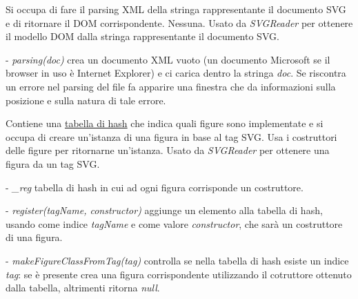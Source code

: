 Si occupa di fare il parsing XML della stringa rappresentante il documento SVG e di ritornare il DOM corrispondente.
Nessuna.
Usato da \textit{SVGReader} per ottenere il modello DOM dalla stringa rappresentante il documento SVG.
\begin{elencopuntato}[\subsubsecindent]
\item[-] \textit{parsing(doc)} crea un documento XML vuoto (un documento Microsoft se il browser in uso \`e Internet Explorer) e ci carica dentro la stringa \textit{doc}. Se riscontra un errore nel parsing del file fa apparire una finestra che da informazioni sulla posizione e sulla natura di tale errore.
\end{elencopuntato}

Contiene una \underline{tabella di hash} che indica quali figure sono implementate e si occupa di creare un'istanza di una figura in base al tag SVG.
Usa i costruttori delle figure per ritornarne un'istanza.
Usato da \textit{SVGReader} per ottenere una figura da un tag SVG.
\begin{elencopuntato}[\subsubsecindent]
\item[-] \textit{{\_}reg} tabella di hash in cui ad ogni figura corrisponde un costruttore.
\end{elencopuntato}
\begin{elencopuntato}[\subsubsecindent]
\item[-] \textit{register(tagName, constructor)} aggiunge un elemento alla tabella di hash, usando come indice \textit{tagName} e come valore \textit{constructor}, che sar\`a un costruttore di una figura.
\item[-] \textit{makeFigureClassFromTag(tag)} controlla se nella tabella di hash esiste un indice \textit{tag}: se \`e presente crea una figura corrispondente utilizzando il cotruttore ottenuto dalla tabella, altrimenti ritorna \textit{null}.
\end{elencopuntato}

